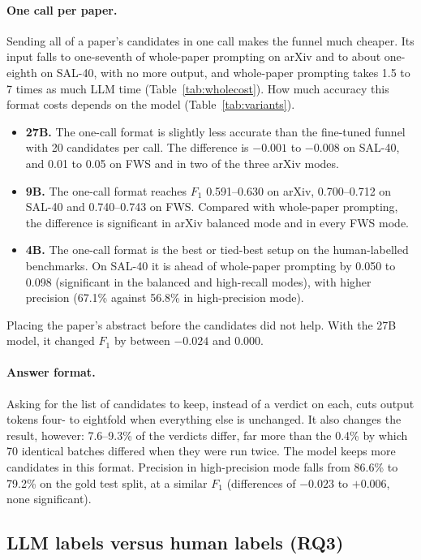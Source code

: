 \paragraph{One call per paper.} Sending all of a paper's candidates in one call makes the funnel much cheaper. Its input falls to one-seventh of whole-paper prompting on arXiv and to about one-eighth on SAL-40, with no more output, and whole-paper prompting takes 1.5 to 7 times as much LLM time (Table~\ref{tab:wholecost}). How much accuracy this format costs depends on the model (Table~\ref{tab:variants}).
\begin{itemize}
  \item \textbf{27B.} The one-call format is slightly less accurate than the fine-tuned funnel with 20 candidates per call. The difference is $-0.001$ to $-0.008$ on SAL-40, and 0.01 to 0.05 on FWS and in two of the three arXiv modes.
  \item \textbf{9B.} The one-call format reaches $F_1$ 0.591--0.630 on arXiv, 0.700--0.712 on SAL-40 and 0.740--0.743 on FWS. Compared with whole-paper prompting, the difference is significant in arXiv balanced mode and in every FWS mode.
  \item \textbf{4B.} The one-call format is the best or tied-best setup on the human-labelled benchmarks. On SAL-40 it is ahead of whole-paper prompting by 0.050 to 0.098 (significant in the balanced and high-recall modes), with higher precision (67.1\% against 56.8\% in high-precision mode).
\end{itemize}
Placing the paper's abstract before the candidates did not help. With the 27B model, it changed $F_1$ by between $-0.024$ and $0.000$.

\paragraph{Answer format.} Asking for the list of candidates to keep, instead of a verdict on each, cuts output tokens four- to eightfold when everything else is unchanged. It also changes the result, however: 7.6--9.3\% of the verdicts differ, far more than the 0.4\% by which 70 identical batches differed when they were run twice. The model keeps more candidates in this format. Precision in high-precision mode falls from 86.6\% to 79.2\% on the gold test split, at a similar $F_1$ (differences of $-0.023$ to $+0.006$, none significant).

\subsection{LLM labels versus human labels (RQ3)}
\label{sec:labels}

